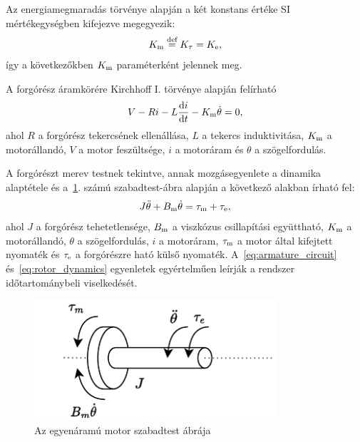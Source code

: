 Az energiamegmaradás törvénye alapján a két konstans értéke SI mértékegységben kifejezve megegyezik:
\begin{align}
    K_{\mathrm{m}} \stackrel{\text{def}}{=} K_{\mathrm{\tau}} = K_{\mathrm{e}},
\end{align}
így a következőkben $K_{\mathrm{m}}$ paraméterként jelennek meg. 

A forgórész áramkörére Kirchhoff I. törvénye alapján felírható
\begin{align}\label{eq:armature_circuit}
    V - Ri - L\frac{\mathrm{d} i}{\mathrm{d} t} - K_{\mathrm{m}}\dot\theta = 0,
\end{align}
ahol $R$ a forgórész tekercsének ellenállása, $L$ a tekercs induktivitása, 
$K_{\mathrm{m}}$ a motorállandó, $V$ a motor feszültsége, $i$ a motoráram és $\theta$ a szögelfordulás.


A forgórészt merev testnek tekintve, annak mozgásegyenlete a dinamika alaptétele és a~\ref{fig:dc_motor_mechanical}. számú 
szabadtest-ábra alapján a következő alakban írható fel:
\begin{align}\label{eq:rotor_dynamics}
    J\ddot\theta + B_{\mathrm{m}}\dot\theta = \tau_{\mathrm{m}} + \tau_{\mathrm{e}},
\end{align}
ahol $J$ a forgórész tehetetlensége, $B_{\mathrm{m}}$ a viszkózus csillapítási együttható, 
$K_{\mathrm{m}}$ a motorállandó, $\theta$ a szögelfordulás, $i$ a motoráram, $\tau_{\mathrm{m}}$ a motor által kifejtett nyomaték 
és $\tau_{\mathrm{e}}$ a forgórészre ható külső nyomaték. 
%
A~\eqref{eq:armature_circuit} és~\eqref{eq:rotor_dynamics} egyenletek egyértelműen leírják a 
rendszer időtartománybeli viselkedését.

\begin{figure}[t!]
	\begin{center}
		\includegraphics[width=9cm]{images/motor_model_mechanical.pdf}
		\caption{Az egyenáramú motor szabadtest ábrája}
		\label{fig:dc_motor_mechanical}
	\end{center}
\end{figure}

